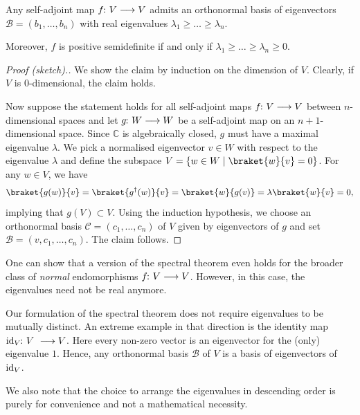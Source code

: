\documentclass[a4paper, oneside, 12pt]{amsart}
\begin{document}
\begin{theorem}\label{thm:spectral-theorem}
  Any self-adjoint map \(f\from V\to V\) admits an orthonormal basis of eigenvectors \(\mathcal{B}=(b_{1}, \dots , b_{n})\) with real eigenvalues \(\lambda_{1}\geq \dots \geq \lambda_{n}\).

  Moreover, \(f\) is positive semidefinite if and only if \(\lambda_{1} \geq \dots \geq \lambda_{n}\geq 0\).
\end{theorem}
\begin{proof}[Proof (sketch).]
  We show the claim by induction on the dimension of \(V\).
  Clearly, if \(V\) is \(0\)-dimensional, the claim holds.

  Now suppose the statement holds for all self-adjoint maps \(f\from V \to V\) between \(n\)-dimensional spaces and let \(g\from W\to W\) be a self-adjoint map on an \(n+1\)-dimensional space.
  Since \( \mathbb{C}\) is algebraically closed, \(g\) must have a maximal eigenvalue \(\lambda\).
  We pick a normalised eigenvector \(v \in W\)  with respect to the eigenvalue \(\lambda\) and define the subspace \(V=\{w\in W\mid \braket{w}{v} = 0\}\).
  For any \(w\in V\), we have
  \begin{equation*}
    \braket{g(w)}{v} = \braket{g^{\dagger}(w)}{v} = \braket{w}{g(v)} = \lambda \braket{w}{v} = 0,
  \end{equation*}
  implying that \(g(V) \subset V\).
  Using the induction hypothesis, we choose an orthonormal basis \(\mathcal{C} = (c_{1}, \dots , c_{n})\) of \(V\) given by eigenvectors of \(g\) and set \(\mathcal{B} = (v, c_{1}, \dots , c_{n})\).
  The claim follows.
\end{proof}

One can show that a version of the spectral theorem even holds for the broader class of \emph{normal}  endomorphisms \(f \from V\to V\).
However, in this case, the eigenvalues need not be real anymore.

\begin{remark}\label{rmk:spectral-theorem-results}
  Our formulation of the spectral theorem does not require eigenvalues to be mutually distinct.
  An extreme example in that direction is the identity map \(\id_{V} \from V\ \to V\).
  Here every non-zero vector is an eigenvector for the (only) eigenvalue \(1\).
  Hence,  any orthonormal basis \(\mathcal{B}\) of \(V\) is a basis of eigenvectors of \(\mathrm{id}_{V}\).

  We also note that the choice to arrange the eigenvalues in descending order is purely for convenience and not a mathematical necessity.
\end{remark}
\end{document}
